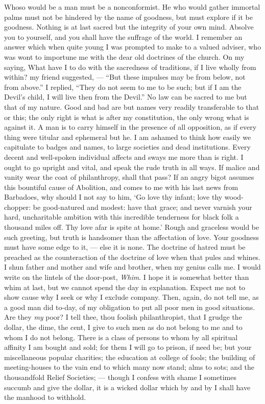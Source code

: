 \documentclass{article}
\begin{document}
Whoso would be a man must be a nonconformist. He who would gather immortal
palms must not be hindered by the name of goodness, but must explore if it
be goodness. Nothing is at last sacred but the integrity of your own mind.
Absolve you to yourself, and you shall have the suffrage of the world. I
remember an answer which when quite young I was prompted to make to a valued
adviser, who was wont to importune me with the dear old doctrines of the
church. On my saying, What have I to do with the sacredness of traditions,
if I live wholly from within? my friend suggested, --- ``But these impulses
may be from below, not from above.'' I replied, ``They do not seem to me to be
such; but if I am the Devil's child, I will live then from the Devil.'' No
law can be sacred to me but that of my nature. Good and bad are but names
very readily transferable to that or this; the only right is what is after
my constitution, the only wrong what is against it. A man is to carry
himself in the presence of all opposition, as if every thing were titular
and ephemeral but he. I am ashamed to think how easily we capitulate to
badges and names, to large societies and dead institutions. Every decent and
well-spoken individual affects and sways me more than is right. I ought to
go upright and vital, and speak the rude truth in all ways. If malice and
vanity wear the coat of philanthropy, shall that pass? If an angry bigot
assumes this bountiful cause of Abolition, and comes to me with his last
news from Barbadoes, why should I not say to him, `Go love thy infant; love
thy wood-chopper: be good-natured and modest: have that grace; and never
varnish your hard, uncharitable ambition with this incredible tenderness for
black folk a thousand miles off. Thy love afar is spite at home.' Rough and
graceless would be such greeting, but truth is handsomer than the
affectation of love. Your goodness must have some edge to it, --- else it is
none. The doctrine of hatred must be preached as the counteraction of the
doctrine of love when that pules and whines. I shun father and mother and
wife and brother, when my genius calls me. I would write on the lintels of
the door-post, {\it Whim}. I hope it is somewhat better than whim at last, but
we cannot spend the day in explanation. Expect me not to show cause why I
seek or why I exclude company. Then, again, do not tell me, as a good man
did to-day, of my obligation to put all poor men in good situations. Are
they {\it my} poor? I tell thee, thou foolish philanthropist, that I grudge the
dollar, the dime, the cent, I give to such men as do not belong to me and to
whom I do not belong. There is a class of persons to whom by all spiritual
affinity I am bought and sold; for them I will go to prison, if need be; but
your miscellaneous popular charities; the education at college of fools; the
building of meeting-houses to the vain end to which many now stand; alms to
sots; and the thousandfold Relief Societies; --- though I confess with shame
I sometimes succumb and give the dollar, it is a wicked dollar which by and
by I shall have the manhood to withhold.
\end{document}
